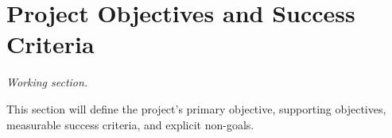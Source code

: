 \section{Project Objectives and Success Criteria}
\label{sec:objectives}

\textit{Working section.}

This section will define the project's primary objective, supporting objectives,
measurable success criteria, and explicit non-goals.
